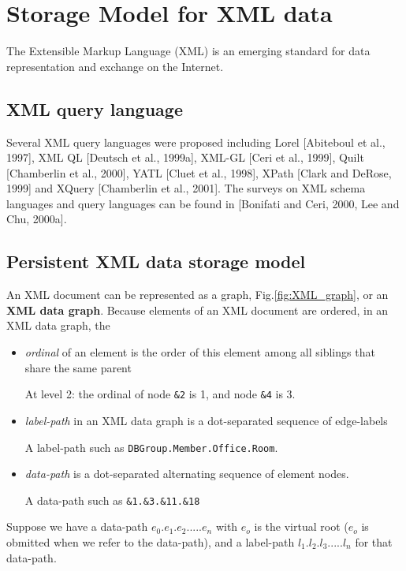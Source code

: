\chapter{Storage Model for XML data}


The Extensible Markup Language (XML) is an
emerging standard for data representation and
exchange on the Internet.

\section{XML query language}

Several XML query languages were proposed including
Lorel [Abiteboul et al., 1997], XML QL
[Deutsch et al., 1999a], XML-GL [Ceri et al., 1999],
Quilt [Chamberlin et al., 2000], YATL
[Cluet et al., 1998], XPath [Clark and DeRose, 1999]
and XQuery [Chamberlin et al., 2001].
The surveys on XML schema languages
and query languages can be found in
[Bonifati and Ceri, 2000, Lee and Chu, 2000a].

\section{Persistent XML data storage model}

An XML document can be represented as a graph, Fig.\ref{fig:XML_graph}, or an
{\bf XML data graph}. Because elements of an XML document are ordered, in an XML
data graph, the
\begin{itemize}
  \item {\it ordinal} of an element is the order of this element among all siblings that
share the same parent

At level 2: the ordinal of node \verb!&2! is 1, and node \verb!&4! is 3.

  \item {\it label-path} in an XML data graph is a dot-separated sequence of
  edge-labels
  
A label-path such as \verb!DBGroup.Member.Office.Room!.  
  
  \item {\it data-path} is a dot-separated alternating sequence of element
  nodes.
  
A data-path such as \verb!&1.&3.&11.&18!
\end{itemize}
Suppose we have a data-path $e_0.e_1.e_2. ... .e_n$ with $e_o$ is the virtual
root ($e_o$ is obmitted when we refer to the data-path), and a label-path
$l_1.l_2.l_3. ... .l_n$ for that data-path.

